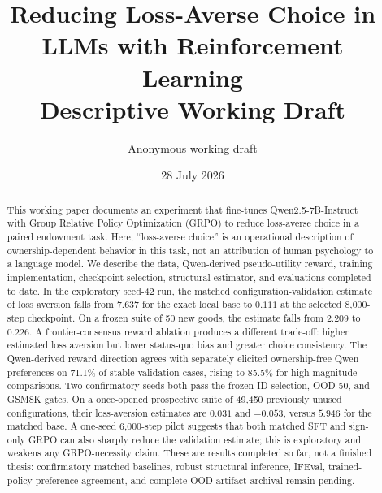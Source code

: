 \documentclass[11pt,letterpaper]{article}
\title{\textbf{Reducing Loss-Averse Choice in LLMs with Reinforcement Learning}\\[0.5em]
\large Descriptive Working Draft}
\author{Anonymous working draft}
\date{28 July 2026}
\begin{document}
\maketitle

\begin{abstract}
This working paper documents an experiment that fine-tunes
Qwen2.5-7B-Instruct with Group Relative Policy Optimization (GRPO) to reduce
loss-averse choice in a paired endowment task. Here, ``loss-averse choice'' is
an operational description of ownership-dependent behavior in this task, not
an attribution of human psychology to a language model. We describe the data,
Qwen-derived pseudo-utility reward, training implementation, checkpoint
selection, structural estimator, and evaluations completed to date. In the
exploratory seed-42 run, the matched configuration-validation estimate of
loss aversion falls from $7.637$ for the exact local base to $0.111$ at the
selected 8,000-step checkpoint. On a frozen suite of 50 new goods, the estimate
falls from $2.209$ to $0.226$. A frontier-consensus reward ablation produces a
different trade-off: higher estimated loss aversion but lower status-quo bias
and greater choice consistency. The Qwen-derived reward direction agrees with
separately elicited ownership-free Qwen preferences on 71.1\% of stable
validation cases, rising to 85.5\% for high-magnitude comparisons. Two
confirmatory seeds both pass the frozen ID-selection, OOD-50, and GSM8K gates.
On a once-opened prospective suite of 49,450 previously unused configurations,
their loss-aversion estimates are $0.031$ and $-0.053$, versus $5.946$ for the
matched base. A one-seed 6,000-step pilot suggests that both matched SFT and
sign-only GRPO can also sharply reduce the validation estimate; this is
exploratory and weakens any GRPO-necessity claim. These are results completed
so far, not a finished thesis: confirmatory matched baselines, robust
structural inference, IFEval, trained-policy preference agreement, and
complete OOD artifact archival remain pending.
\end{abstract}

\noindent{}
\end{document}
